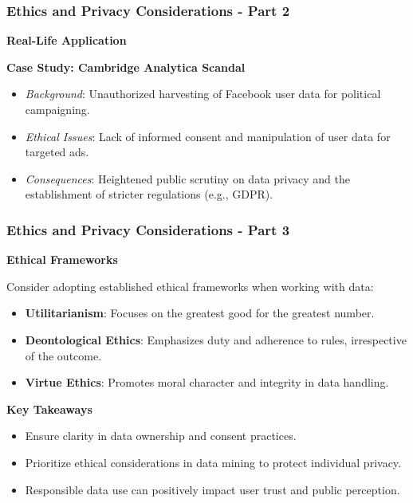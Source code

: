\documentclass{beamer}
\begin{document}
\begin{frame}[fragile]
    \frametitle{Ethics and Privacy Considerations - Part 2}

    \textbf{Real-Life Application}
    
    \textbf{Case Study: Cambridge Analytica Scandal}
    \begin{itemize}
        \item \textit{Background}: Unauthorized harvesting of Facebook user data for political campaigning.
        \item \textit{Ethical Issues}: Lack of informed consent and manipulation of user data for targeted ads.
        \item \textit{Consequences}: Heightened public scrutiny on data privacy and the establishment of stricter regulations (e.g., GDPR).
    \end{itemize}
\end{frame}

\begin{frame}[fragile]
    \frametitle{Ethics and Privacy Considerations - Part 3}

    \textbf{Ethical Frameworks}
    
    Consider adopting established ethical frameworks when working with data:
    \begin{itemize}
        \item \textbf{Utilitarianism}: Focuses on the greatest good for the greatest number.
        \item \textbf{Deontological Ethics}: Emphasizes duty and adherence to rules, irrespective of the outcome.
        \item \textbf{Virtue Ethics}: Promotes moral character and integrity in data handling.
    \end{itemize}

    \textbf{Key Takeaways}
    \begin{itemize}
        \item Ensure clarity in data ownership and consent practices.
        \item Prioritize ethical considerations in data mining to protect individual privacy.
        \item Responsible data use can positively impact user trust and public perception.
    \end{itemize}
\end{frame}
\end{document}
